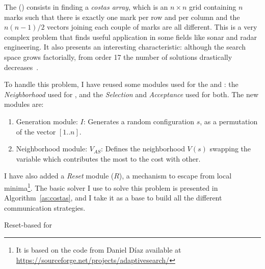 The \carrp{} (\CARRP) consists in finding a \textit{costas array}, which is an $n\times n$ grid containing $n$ marks such that there is exactly one mark per row and per column and the $n(n-1)/2$ vectors joining each couple of marks are all different. This is a very complex problem that finds useful application in some fields like sonar and radar engineering. It also presents an interesting characteristic: although the search space grows factorially, from order 17 the number of solutions drastically decreases~\cite{Drakakis2006}.

To handle this problem, I have reused some modules used for the \sgp{} and \nqp: the {\it Neighborhood} \om{} used for \nq{}, and the \textit{Selection} and \textit{Acceptance} \oms{} used for both. The new modules are: 

\begin{enumerate}
	\item Generation module:
	\subitem $I$: Generates a random configuration $s$, as a permutation of the vector $[1..n]$. 
	\item Neighborhood module:
	\subitem $V_{AS}$: Defines the neighborhood $V\left(s\right)$ swapping the variable which contributes the most to the cost with other.
\end{enumerate}

I have also added a {\it Reset} module ($R$), a mechanism to escape from local minima\footnote{It is based on the code from Daniel D\'{i}az available at \href{https://sourceforge.net/projects/adaptivesearch/}{https://sourceforge.net/projects/adaptivesearch/}}. The basic solver I use to solve this problem is presented in Algorithm~\ref{as:costas}, and I take it as a base to build all the different communication strategies.  

\begin{algorithm}[H]
\dontprintsemicolon
\SetNoline
{}
\caption{Reset-based \as{} for \CARRP}\label{as:costas}
\end{algorithm}


